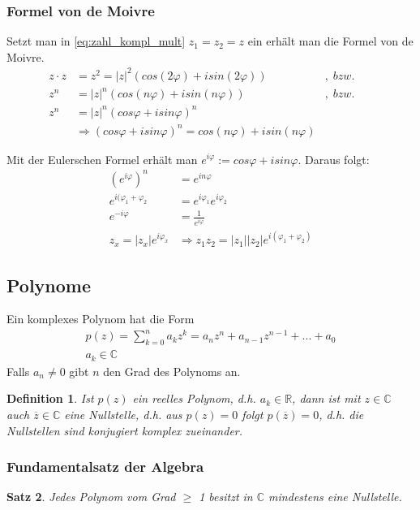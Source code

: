 \documentclass[12pt,a4paper]{report}%
\newtheorem{satz}{Satz}[section]
\newtheorem{definition}[satz]{Definition}
\numberwithin{equation}{section}
\newcommand{\R}{\mathbb{R}} %
\newcommand{\C}{\mathbb{C}}
\numberwithin{equation}{subsection}
\begin{document}
	  \subsubsection{Formel von de Moivre}
	  Setzt man in \eqref{eq:zahl_kompl_mult} $z_1 = z_2 = z$ ein erhält man die Formel von de Moivre.
	  \begin{align}
	    z \cdot z &= z^2 = |z|^2 (cos(2\varphi) + isin(2\varphi)) &,\; bzw.&&\nonumber\\
	    z^n &= |z|^n(cos(n\varphi)  + isin(n \varphi)) &,\; bzw.&&\nonumber\\
	    z^n& = |z|^n(cos\varphi + isin\varphi)^n\nonumber\\
	    &\Rightarrow (cos\varphi + isin\varphi)^n = cos(n\varphi) + isin(n\varphi)
	  \end{align}
	
	  Mit der Eulerschen Formel erhält man $e^{i\varphi} := cos\varphi + isin\varphi$. Daraus folgt:
	  \begin{align}
	  (e^{i\varphi})^n &= e^{in\varphi} \\
	  e^{i(\varphi_1 + \varphi_2} &= e^{i\varphi_1} e^{i\varphi_2}\\
	  e^{-i\varphi} &= \frac{1}{e^{i\varphi}}\\
	  z_x = |z_x|e^{i\varphi_x} &\Rightarrow z_1 z_2 = |z_1| |z_2| e^{i(\varphi_1 + \varphi_2)}
	  \end{align}

  \subsection{Polynome}
  Ein komplexes Polynom hat die Form
  \begin{align}
    p(z) = \sum_{k=0}^n a_k z^k = a_n z^n + a_{n-1} z^{n-1} + ... + a_0 \\
    a_k \in \C \nonumber
  \end{align}
  Falls $a_n \neq 0$ gibt $n$ den Grad des Polynoms an.
  \newline
  \begin{definition} 
    \glqq Ist $p(z)$ ein reelles Polynom, d.h. $a_k \in \R$, dann ist mit $z\in \C$ auch 
  $\overline{z} \in \C$ eine Nullstelle, d.h. aus $p(z) = 0$ folgt $p(\overline{z}) = 0$, d.h. die
  Nullstellen sind konjugiert komplex zueinander. \grqq \cite{HM12}
  \end{definition}

	\subsubsection{Fundamentalsatz der Algebra}
	\begin{satz}
	  Jedes Polynom vom Grad $\geq$ 1 besitzt in $\C$ mindestens eine Nullstelle.     
	  \label{satz:fund_alg}
	\end{satz}
	  
\end{document}
